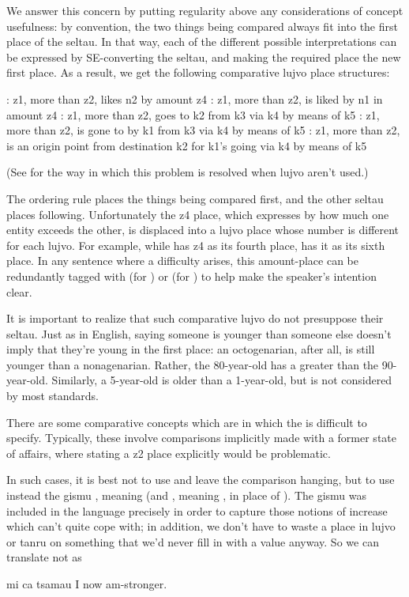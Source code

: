 We answer this concern by putting regularity above any
    considerations of concept usefulness: by convention, the two
    things being compared always fit into the first place of the
    seltau. In that way, each of the different possible
    interpretations can be expressed by SE-converting the seltau,
    and making the required place the new first place. As a result,
    we get the following comparative lujvo place structures:
\begin{example}
: z1, more than z2, likes n2\n
\T	by amount z4\n
{}: z1, more than z2, is liked by n1\n
\T	in amount z4\n
{}: z1, more than z2, goes to k2 from k3\n
\T	via k4 by means of k5\n
{}: z1, more than z2, is gone to by k1\n
\T	from k3 via k4 by means of k5\n
{}: z1, more than z2, is an origin point\n
\T	from destination k2 for k1's going via k4\n
\T	by means of k5
\end{example}

(See  for the way in which
    this problem is resolved when lujvo aren't used.) 

The ordering rule places the things being compared first,
    and the other seltau places following. Unfortunately the z4
    place, which expresses by how much one entity exceeds the
    other, is displaced into a lujvo place whose number is
    different for each lujvo. For example, while  has
    z4 as its fourth place,  has it as its sixth place.
    In any sentence where a difficulty arises, this amount-place
    can be redundantly tagged with  (for ) or
     (for ) to help make the speaker's intention
    clear.

It is important to realize that such comparative lujvo do
    not presuppose their seltau. Just as in English, saying someone
    is younger than someone else doesn't imply that they're young
    in the first place: an octogenarian, after all, is still
    younger than a nonagenarian. Rather, the 80-year-old has a
    greater  than the 90-year-old. Similarly, a
    5-year-old is older than a 1-year-old, but is not considered
     by most standards.

There are some comparative concepts which are in which the
     is difficult to specify. Typically, these involve
    comparisons implicitly made with a former state of affairs,
    where stating a z2 place explicitly would be problematic.

In such cases, it is best not to use  and leave the
    comparison hanging, but to use instead the gismu ,
    meaning  (and , meaning , in
    place of ). The gismu  was included in the
    language precisely in order to capture those notions of
    increase which  can't quite cope with; in addition, we
    don't have to waste a place in lujvo or tanru on something that
    we'd never fill in with a value anyway. So we can translate
     not as
\begin{example}
mi ca tsamau\n
I now am-stronger.
\end{example}

